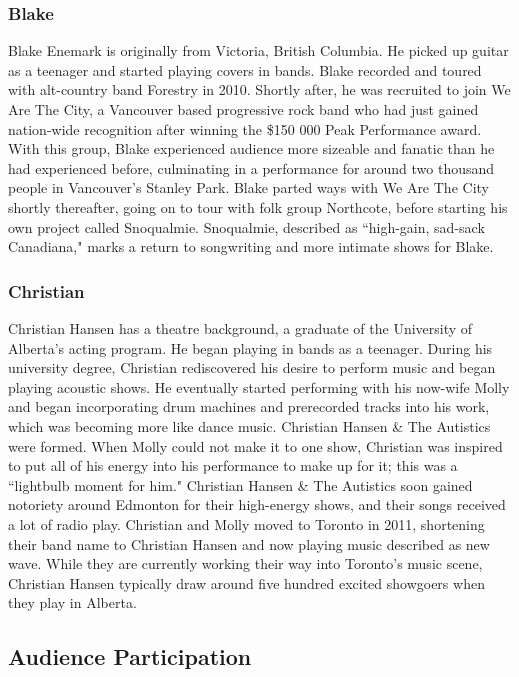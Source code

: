 \subsubsection{Blake}
Blake Enemark is originally from Victoria, British Columbia. He picked up guitar as a teenager and started playing covers in bands. Blake recorded and toured with alt-country band Forestry in 2010. Shortly after, he was recruited to join We Are The City, a Vancouver based progressive rock band who had just gained nation-wide recognition after winning the \$150 000 Peak Performance award. With this group, Blake experienced audience more sizeable and fanatic than he had experienced before, culminating in a performance for around two thousand people in Vancouver's Stanley Park. Blake parted ways with We Are The City shortly thereafter, going on to tour with folk group Northcote, before starting his own project called Snoqualmie. Snoqualmie, described as ``high-gain, sad-sack Canadiana," marks a return to songwriting and more intimate shows for Blake.

\subsubsection{Christian}
Christian Hansen has a theatre background, a graduate of the University of Alberta's acting program. He began playing in bands as a teenager. During his university degree, Christian rediscovered his desire to perform music and began playing acoustic shows. He eventually started performing with his now-wife Molly and began incorporating drum machines and prerecorded tracks into his work, which was becoming more like dance music. Christian Hansen \& The Autistics were formed. When Molly could not make it to one show, Christian was inspired to put all of his energy into his performance to make up for it; this was a ``lightbulb moment for him." Christian Hansen \& The Autistics soon gained notoriety around Edmonton for their high-energy shows, and their songs received a lot of radio play. Christian and Molly moved to Toronto in 2011, shortening their band name to Christian Hansen and now playing music described as new wave. While they are currently working their way into Toronto's music scene, Christian Hansen typically draw around five hundred excited showgoers when they play in Alberta.

\subsection{Audience Participation}

